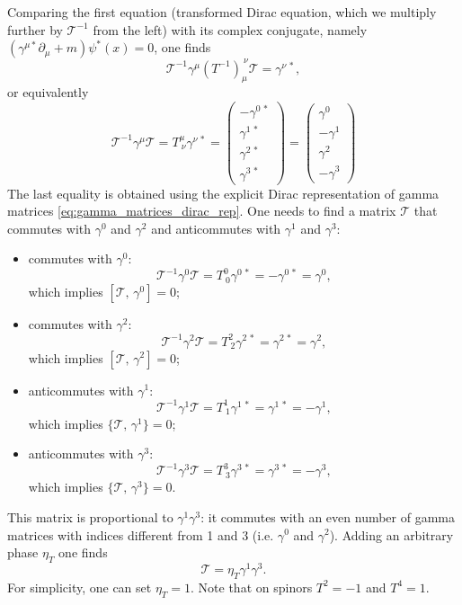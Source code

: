 Comparing the first equation (transformed Dirac equation, which we multiply further by \(\mathcal{T}^{-1}\) from the left) with its complex conjugate, namely \((\gamma^{\mu *}\partial_\mu + m)\psi^*(x) = 0\), one finds
\[
    \mathcal{T}^{-1} \gamma^{\mu} \left(T^{-1}\right)_{\mu}^{\ \nu} \mathcal{T} = \gamma^{\nu\,*},
\]
or equivalently
\[
    \mathcal{T}^{-1} \gamma^{\mu} \mathcal{T} = T^{\mu}_{\ \nu} \gamma^{\nu\,*} = \begin{pmatrix}
        -\gamma^{0\,*} \\
        \gamma^{1\,*}  \\
        \gamma^{2\, *} \\
        \gamma^{3\, *}
    \end{pmatrix} = \begin{pmatrix}
        \gamma^0  \\
        -\gamma^1 \\
        \gamma^2  \\
        -\gamma^3
    \end{pmatrix}
\]
The last equality is obtained using the explicit Dirac representation of gamma matrices \eqref{eq:gamma_matrices_dirac_rep}.
One needs to find a matrix \(\mathcal{T}\) that commutes with \(\gamma^0\) and \(\gamma^2\) and anticommutes with \(\gamma^1\) and \(\gamma^3\):
\begin{itemize}
    \item[(\(\mu=0\))] commutes with \(\gamma^0\):
          \[
              \mathcal{T}^{-1} \gamma^0 \mathcal{T} = T^0_{\ 0} \gamma^{0\,*} = -\gamma^{0\,*} = \gamma^0,
          \]
          which implies \(\left[\mathcal{T},\,\gamma^0\right] = 0\);
    \item[(\(\mu=2\))] commutes with \(\gamma^2\):
          \[
              \mathcal{T}^{-1} \gamma^2 \mathcal{T} = T^2_{\ 2} \gamma^{2\,*} = \gamma^{2\,*} = \gamma^2,
          \]
          which implies \(\left[\mathcal{T},\,\gamma^2\right] = 0\);
    \item[(\(\mu=1\))] anticommutes with \(\gamma^1\):
          \[
              \mathcal{T}^{-1} \gamma^1 \mathcal{T} = T^1_{\ 1} \gamma^{1\,*} = \gamma^{1\,*} = -\gamma^1,
          \]
          which implies \(\{\mathcal{T},\,\gamma^1\} = 0\);
    \item[(\(\mu=3\))] anticommutes with \(\gamma^3\):
          \[
              \mathcal{T}^{-1} \gamma^3 \mathcal{T} = T^3_{\ 3} \gamma^{3\,*} = \gamma^{3\,*} = -\gamma^3,
          \]
          which implies \(\{\mathcal{T},\,\gamma^3\} = 0\).
\end{itemize}
This matrix is proportional to \(\gamma^1\gamma^3\): it commutes with an even number of gamma matrices with indices different from 1 and 3 (i.e. \(\gamma^0\) and \(\gamma^2\)). Adding an arbitrary phase \(\eta_T\) one finds
\[
    \mathcal{T} = \eta_T \gamma^1 \gamma^3.
\]
For simplicity, one can set \(\eta_T = 1\). Note that on spinors \(T^2 = -1\) and \(T^4=1\).

